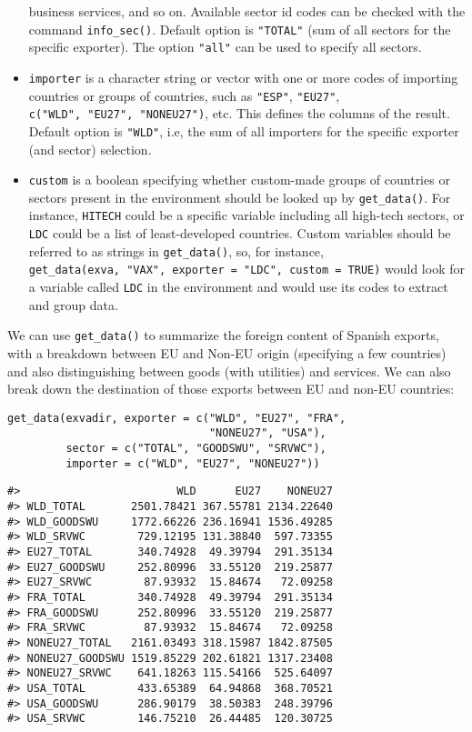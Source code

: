 \begin{itemize}
  business services, and so on. Available sector id codes can be checked with
  the command \texttt{info\_sec()}. Default option is \texttt{"TOTAL"} (sum of all
  sectors for the specific exporter). The option \texttt{"all"} can be used to
  specify all sectors.
\item
  \texttt{importer} is a character string or vector with one or more codes of
  importing countries or groups of countries, such as \texttt{"ESP"},
  \texttt{"EU27"}, \texttt{c("WLD",\ "EU27",\ "NONEU27")}, etc. This defines the
  columns of the result. Default option is \texttt{"WLD"}, i.e, the sum of all
  importers for the specific exporter (and sector) selection.
\item
  \texttt{custom} is a boolean specifying whether custom-made groups of countries
  or sectors present in the environment should be looked up by \texttt{get\_data()}.
  For instance, \texttt{HITECH} could be a specific variable including all
  high-tech sectors, or \texttt{LDC} could be a list of least-developed countries.
  Custom variables should be referred to as strings in \texttt{get\_data()}, so, for
  instance, \texttt{get\_data(exva,\ "VAX",\ exporter\ =\ "LDC",\ custom\ =\ TRUE)} would
  look for a variable called \texttt{LDC} in the environment and would use its
  codes to extract and group data.
\end{itemize}

We can use \texttt{get\_data()} to summarize the foreign content of Spanish
exports, with a breakdown between EU and Non-EU origin (specifying a few
countries) and also distinguishing between goods (with utilities) and
services. We can also break down the destination of those exports between EU
and non-EU countries:

\begin{verbatim}
get_data(exvadir, exporter = c("WLD", "EU27", "FRA",
                               "NONEU27", "USA"),
         sector = c("TOTAL", "GOODSWU", "SRVWC"),
         importer = c("WLD", "EU27", "NONEU27"))
\end{verbatim}

\begin{verbatim}
#>                        WLD      EU27    NONEU27
#> WLD_TOTAL       2501.78421 367.55781 2134.22640
#> WLD_GOODSWU     1772.66226 236.16941 1536.49285
#> WLD_SRVWC        729.12195 131.38840  597.73355
#> EU27_TOTAL       340.74928  49.39794  291.35134
#> EU27_GOODSWU     252.80996  33.55120  219.25877
#> EU27_SRVWC        87.93932  15.84674   72.09258
#> FRA_TOTAL        340.74928  49.39794  291.35134
#> FRA_GOODSWU      252.80996  33.55120  219.25877
#> FRA_SRVWC         87.93932  15.84674   72.09258
#> NONEU27_TOTAL   2161.03493 318.15987 1842.87505
#> NONEU27_GOODSWU 1519.85229 202.61821 1317.23408
#> NONEU27_SRVWC    641.18263 115.54166  525.64097
#> USA_TOTAL        433.65389  64.94868  368.70521
#> USA_GOODSWU      286.90179  38.50383  248.39796
#> USA_SRVWC        146.75210  26.44485  120.30725
\end{verbatim}

